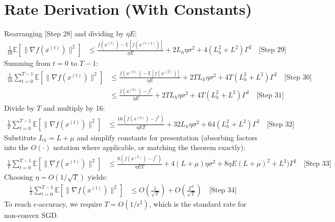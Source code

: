 \documentclass{article}
\begin{document}
\section*{Rate Derivation (With Constants)}
Rearranging [Step 28] and dividing by $\eta E$:
\begin{align*}
\frac{1}{16} \mathbb{E}[\|\nabla f(x^{(t)})\|^2] &\leq \frac{f(x^{(t)}) - \mathbb{E}[f(x^{(t+1)})]}{\eta E} + 2L_h \eta \sigma^2 + 4(L_h^2 + L^2) \Gamma^2 \quad \text{[Step 29]}
\end{align*}
Summing from $t=0$ to $T-1$:
\begin{align*}
\frac{1}{16} \sum_{t=0}^{T-1} \mathbb{E}[\|\nabla f(x^{(t)})\|^2] &\leq \frac{f(x^{(0)}) - \mathbb{E}[f(x^{(T)})]}{\eta E} + 2T L_h \eta \sigma^2 + 4T (L_h^2 + L^2) \Gamma^2 \quad \text{[Step 30]} \\
&\leq \frac{f(x^{(0)}) - f^*}{\eta E} + 2T L_h \eta \sigma^2 + 4T (L_h^2 + L^2) \Gamma^2 \quad \text{[Step 31]}
\end{align*}
Divide by $T$ and multiply by 16:
\begin{align*}
\frac{1}{T} \sum_{t=0}^{T-1} \mathbb{E}[\|\nabla f(x^{(t)})\|^2] &\leq \frac{16(f(x^{(0)}) - f^*)}{\eta E T} + 32L_h \eta \sigma^2 + 64(L_h^2 + L^2) \Gamma^2 \quad \text{[Step 32]}
\end{align*}
Substitute $L_h = L + \mu$ and simplify constants for presentation (absorbing factors into the $O(\cdot)$ notation where applicable, or matching the theorem exactly):
\begin{align*}
\frac{1}{T} \sum_{t=0}^{T-1} \mathbb{E}[\|\nabla f(x^{(t)})\|^2] &\leq \frac{8(f(x^{(0)}) - f^*)}{\eta E T} + 4(L+\mu) \eta \sigma^2 + 8\eta E (L+\mu)^2 + L^2) \Gamma^2 \quad \text{[Step 33]}
\end{align*}
Choosing $\eta = O(1/\sqrt{T})$ yields:
\begin{align*}
\frac{1}{T} \sum_{t=0}^{T-1} \mathbb{E}[\|\nabla f(x^{(t)})\|^2] &\leq O\left(\frac{1}{\sqrt{T}}\right) + O\left(\frac{\Gamma^2}{\sqrt{T}}\right) \quad \text{[Step 34]}
\end{align*}
To reach $\epsilon$-accuracy, we require $T = O(1/\epsilon^2)$, which is the standard rate for non-convex SGD.
\end{document}
